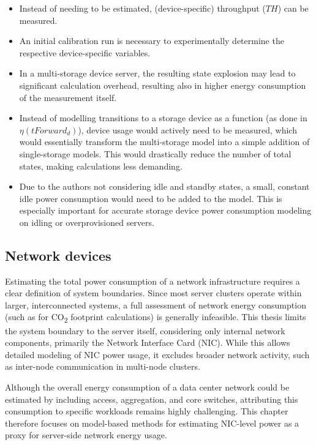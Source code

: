 \begin{itemize}
    \item Instead of needing to be estimated, (device-specific) throughput ($TH$) can be measured.
    \item An initial calibration run is necessary to experimentally determine the respective device-specific variables.
    \item In a multi-storage device server, the resulting state explosion may lead to significant calculation overhead, resulting also in higher energy consumption of the measurement itself.
    \item Instead of modelling transitions to a storage device as a function (as done in $\eta(tForward_d)$), device usage would actively need to be measured, which would essentially transform the multi-storage model into a simple addition of single-storage models. This would drastically reduce the number of total states, making calculations less demanding.
    \item Due to the authors not considering idle and standby states, a small, constant idle power consumption would need to be added to the model. This is especially important for accurate storage device power consumption modeling on idling or overprovisioned servers.

\end{itemize}

\subsection{Network devices}
\label{sec:NIC_modeling}
Estimating the total power consumption of a network infrastructure requires a clear definition of system boundaries. Since most server clusters operate within larger, interconnected systems, a full assessment of network energy consumption (such as for CO\textsubscript{2} footprint calculations) is generally infeasible. This thesis limits the system boundary to the server itself, considering only internal network components, primarily the Network Interface Card (NIC). While this allows detailed modeling of NIC power usage, it excludes broader network activity, such as inter-node communication in multi-node clusters.

Although the overall energy consumption of a data center network could be estimated by including access, aggregation, and core switches, attributing this consumption to specific workloads remains highly challenging. This chapter therefore focuses on model-based methods for estimating NIC-level power as a proxy for server-side network energy usage.

